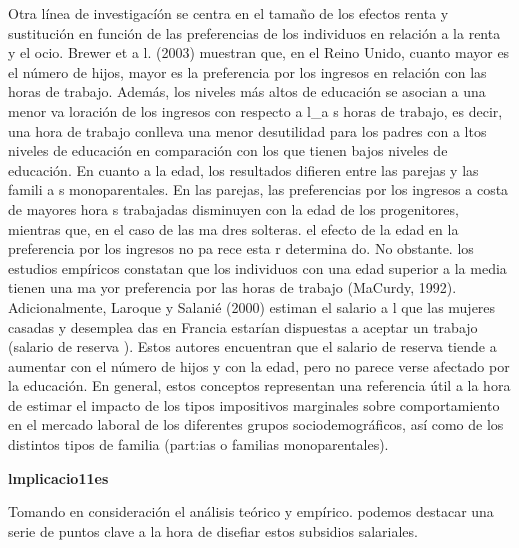 \documentclass[10pt,a4paper]{article}
\begin{document}
Otra línea de investigacíón se centra en el tamaño de los efectos renta y sustitución en función de las preferencias de los individuos en relación a la renta y el ocio. Brewer et a l. (2003) muestran que, en el Reino Unido, cuanto mayor es el número de hijos, mayor es la preferencia por los ingresos en relación con las horas de trabajo. Además, los niveles más altos de educación se asocian a una menor va loración de los ingresos con respecto a l_a s horas de trabajo, es decir, una hora de trabajo conlleva una menor desutilidad para los padres con a ltos niveles de educación en comparación con los que tienen bajos niveles de educación. En cuanto a la edad, los resultados difieren entre las parejas y las famili a s monoparentales. En las parejas, las preferencias por los ingresos a costa de mayores hora s trabajadas disminuyen con la edad de los progenitores, mientras que, en el caso de las ma dres solteras. el efecto de la edad en la preferencia por los ingresos no pa rece esta r determina do. No obstante. los estudios empíricos constatan que los individuos con una edad superior a la media tienen una ma yor preferencia por las horas de trabajo (MaCurdy, 1992). Adicionalmente, Laroque y Salanié (2000) estiman el salario a l que las mujeres casadas y desemplea das en Francia estarían dispuestas a aceptar un trabajo (salario de reserva ). Estos autores encuentran que el salario de reserva tiende a aumentar con el número de hijos y con la edad, pero no parece verse afectado por la educación. En general, estos conceptos representan una referencia útil a la hora de estimar el impacto de los tipos impositivos marginales sobre comportamiento en el mercado laboral de los diferentes grupos sociodemográficos, así como de los distintos tipos de familia (part:ias o familias monoparentales).

\textbf{lmplicacio11es }

Tomando en consideración el análisis teórico y empírico. podemos destacar una serie de puntos clave a la hora de disefiar estos subsidios salariales.
\end{document}
